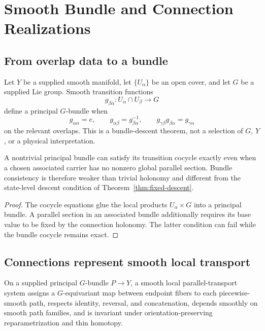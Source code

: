 \documentclass[11pt]{article}
\begin{document}
\section{Smooth Bundle and Connection Realizations}

\subsection{From overlap data to a bundle}

Let $Y$ be a supplied smooth manifold, let $\{U_\alpha\}$ be an open cover,
and let $G$ be a supplied Lie group.  Smooth transition functions
\[
 g_{\beta\alpha}:U_\alpha\cap U_\beta\longrightarrow G
\]
define a principal $G$-bundle when
\[
 g_{\alpha\alpha}=e,\qquad
 g_{\alpha\beta}=g_{\beta\alpha}^{-1},\qquad
 g_{\gamma\beta}g_{\beta\alpha}=g_{\gamma\alpha}
\]
on the relevant overlaps.  This is a bundle-descent theorem, not a selection
of $G$, $Y$, or a physical interpretation.

\begin{proposition}
\label{prop:bundle-section}
A nontrivial principal bundle can satisfy its transition cocycle exactly even
when a chosen associated carrier has no nonzero global parallel section.
Bundle consistency is therefore weaker than trivial holonomy and different
from the state-level descent condition of
Theorem~\ref{thm:fixed-descent}.
\end{proposition}

\begin{proof}
The cocycle equations glue the local products $U_\alpha\times G$ into a
principal bundle.  A parallel section in an associated bundle additionally
requires its base value to be fixed by the connection holonomy.  The latter
condition can fail while the bundle cocycle remains exact.
\end{proof}

\subsection{Connections represent smooth local transport}

\begin{definition}
On a supplied principal $G$-bundle $P\to Y$, a smooth local parallel-transport
system assigns a $G$-equivariant map between endpoint fibers to each
piecewise-smooth path, respects identity, reversal, and concatenation, depends
smoothly on smooth path families, and is invariant under orientation-preserving
reparametrization and thin homotopy.
\end{definition}
\end{document}
